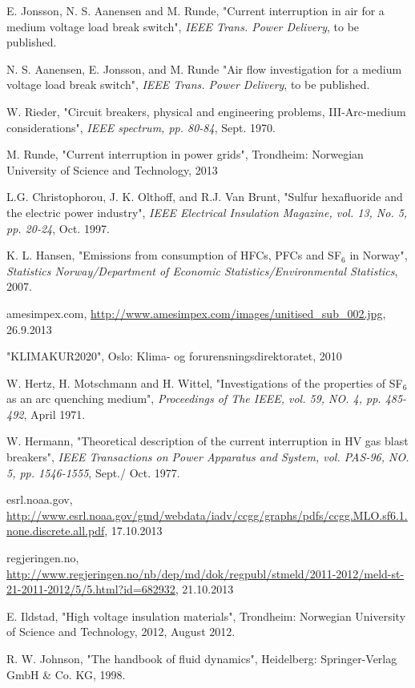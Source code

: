 \documentclass[10pt,a4paper]{article}
\begin{document}
\newpage
\begin{thebibliography}{10}

 E. Jonsson, N. S. Aanensen and M. Runde, "Current interruption in air for a medium voltage load break switch", \textit{IEEE Trans. Power Delivery}, to be published.

 N. S. Aanensen, E. Jonsson, and M. Runde "Air flow investigation for a medium voltage load break switch", \textit{IEEE Trans. Power Delivery}, to be published.

 W. Rieder, "Circuit breakers, physical and engineering problems, III-Arc-medium considerations", \textit{IEEE spectrum, pp. 80-84}, Sept. 1970.

 M. Runde, "Current interruption in power grids", Trondheim: Norwegian University of Science and Technology, 2013

 L.G. Christophorou, J. K. Olthoff, and R.J. Van Brunt, "Sulfur hexafluoride and the electric power industry", \textit{IEEE Electrical Insulation Magazine, vol. 13, No. 5, pp. 20-24}, Oct. 1997.

 K. L. Hansen, "Emissions from consumption of HFCs, PFCs and SF$_6$ in Norway", \textit{Statistics Norway/Department of Economic Statistics/Environmental Statistics}, 2007.

 amesimpex.com, \url{http://www.amesimpex.com/images/unitised_sub_002.jpg}, 26.9.2013


 "KLIMAKUR2020", Oslo: Klima- og forurensningsdirektoratet, 2010


 W. Hertz, H. Motschmann and H. Wittel, "Investigations of the properties of SF$_6$ as an arc quenching medium", \textit{Proceedings of The IEEE, vol. 59, NO. 4, pp. 485-492}, April 1971.

 W. Hermann, "Theoretical description of the current interruption in HV gas blast breakers", \textit{IEEE Transactions on Power Apparatus and System, vol. PAS-96, NO. 5, pp. 1546-1555}, Sept./ Oct. 1977.

 esrl.noaa.gov, \url{http://www.esrl.noaa.gov/gmd/webdata/iadv/ccgg/graphs/pdfs/ccgg.MLO.sf6.1.none.discrete.all.pdf}, 17.10.2013


 regjeringen.no, \url{http://www.regjeringen.no/nb/dep/md/dok/regpubl/stmeld/2011-2012/meld-st-21-2011-2012/5/5.html?id=682932}, 21.10.2013



 E. Ildstad, "High voltage insulation materials", Trondheim: Norwegian University of Science and Technology, 2012, August 2012.

 R. W. Johnson, "The handbook of fluid dynamics", Heidelberg: Springer-Verlag GmbH \& Co. KG, 1998.

\end{thebibliography}
\end{document}
